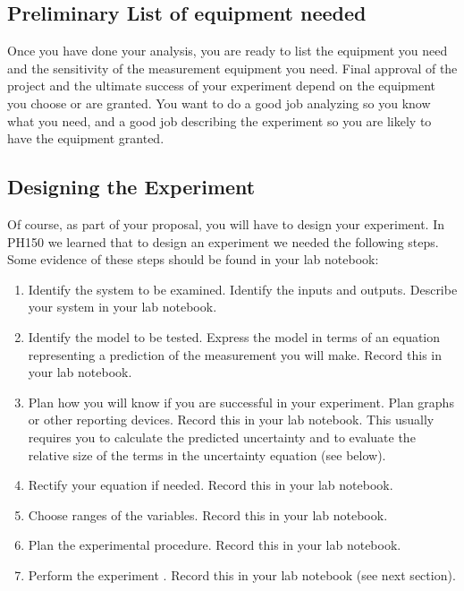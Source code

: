 \subsection{Preliminary List of equipment needed}

Once you have done your analysis, you are ready to list the equipment you need and the sensitivity of the measurement equipment you need. Final approval of the project and the ultimate success of your experiment depend on the equipment you choose or are granted. You want to do a good job analyzing so you know what you need, and a good job describing the experiment so you are likely to have the equipment granted.

\subsection{Designing the Experiment}

Of course, as part of your proposal, you will have to design your experiment. In PH150 we learned that to design an experiment we needed the following steps. Some evidence of these steps should be found in your lab notebook:

\begin{enumerate}
	\item Identify the system to be examined. Identify the inputs and outputs.
	Describe your system in your lab notebook.
	
	\item Identify the model to be tested. Express the model in terms of an
	equation representing a prediction of the measurement you will make. Record
	this in your lab notebook.
	
	\item Plan how you will know if you are successful in your experiment. Plan
	graphs or other reporting devices. Record this in your lab notebook. This
	usually requires you to calculate the predicted uncertainty and to evaluate
	the relative size of the terms in the uncertainty equation (see below).
	
	\item Rectify your equation if needed. Record this in your lab notebook.
	
	\item Choose ranges of the variables. Record this in your lab notebook.
	
	\item Plan the experimental procedure. Record this in your lab notebook.
	
	\item Perform the experiment . Record this in your lab notebook (see next
	section).
\end{enumerate}

